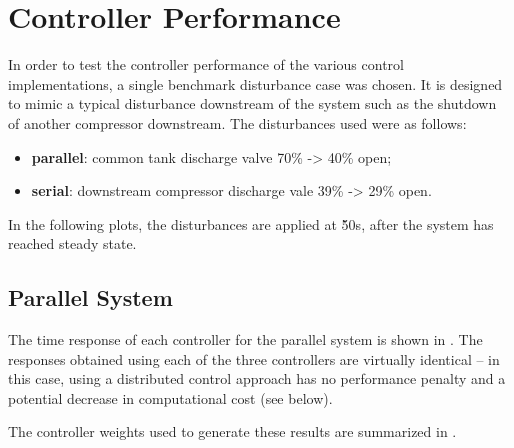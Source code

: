 \section{Controller Performance}
\label{sec:results:performance}

\newif\ifmakeplots
\makeplotstrue


In order to test the controller performance of the various control implementations, a single benchmark disturbance case was chosen.
It is designed to mimic a typical disturbance downstream of the system such as the shutdown of another compressor downstream.
The disturbances used were as follows:

\begin{itemize}
  \item \textbf{parallel}: common tank discharge valve 70\% -> 40\% open;
  \item \textbf{serial}: downstream compressor discharge vale 39\% -> 29\% open.
\end{itemize}
In the following plots, the disturbances are applied at \u{50}{s}, after the system has reached steady state.


\subsection{Parallel System}
\label{sec:results:performance:parallel}


The time response of each controller for the parallel system is shown in .
The responses obtained using each of the three controllers are virtually identical -- in this case, using a distributed control approach has no performance penalty and a potential decrease in computational cost (see below).

The controller weights used to generate these results are summarized in .


